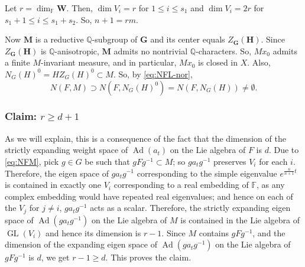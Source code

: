 \documentclass[12pt,reqno]{amsart}
\newcommand{\GL}{\operatorname{GL}}
\numberwithin{equation}{section}
\theoremstyle{plain}
\theoremstyle{definition}
\theoremstyle{remark}
\newcommand\bfG{\mathbf{G}}
\newcommand\bfH{\mathbf{H}}
\newcommand\bfM{\mathbf{M}}
\newcommand\bfW{\mathbf{W}}
\newcommand\bbF{\mathbb{F}}
\newcommand{\Q}{\mathbb{Q}}
\DeclareMathOperator{\Ad}{Ad}
\begin{document}
    Let $r=\dim_\bbF \bfW$. Then, $\dim V_i=r$ for $1\leq i\leq s_1$ and $\dim V_{i}=2r$ for $s_1+1\leq i\leq s_1+s_2$. So, $n+1=rm$. 
    
    Now $\bfM$ is a reductive $\Q$-subgroup of $\bfG$ and its center equals $Z_\bfG(\bfH)$.  
    Since $Z_\bfG(\bfH)$ is $\Q$-anisotropic, $\bfM$ admits no nontrivial $\Q$-characters. So, $Mx_0$ admits a finite $M$-invariant measure, and in particular, $Mx_0$ is closed in $X$. Also, $N_G(H)^0=HZ_G(H)^0\subset M$. So, by \eqref{eq:NFL-nor},
    \begin{equation}
        \label{eq:NFM}
         N(F,M)\supset N(F,N_G(H)^0)=N(F,N_G(H))\neq \emptyset. 
    \end{equation}
   
   \subsubsection{Claim: $r\geq d+1$} \label{claim:3.2.1} As we will explain, this is a consequence of the fact that the dimension of the strictly expanding weight space of $\Ad(a_t)$ on the Lie algebra of $F$ is $d$. Due to \eqref{eq:NFM}, pick $g\in G$ be such that $gFg^{-1}\subset M$; so $ga_tg^{-1}$ preserves $V_i$ for each $i$. Therefore, the eigen space of $ga_tg^{-1}$ corresponding to the simple eigenvalue $e^{\frac{n}{n+1}t}$ is contained in exactly one $V_i$ corresponding to a real embedding of $\bbF$, as any complex embedding would have repeated real eigenvalues; and hence on each of the $V_j$ for $j\neq i$, $ga_tg^{-1}$ acts as a scalar. Therefore, the strictly expanding eigen space of $\Ad(ga_tg^{-1})$ on the Lie algebra of $M$ is contained in the Lie algebra of $\GL(V_i)$ and hence its dimension is $r-1$. Since $M$ contains $gFg^{-1}$, and the dimension of the expanding eigen space of $\Ad(ga_tg^{-1})$ on the Lie algebra of $gFg^{-1}$ is $d$, we get $r-1\geq d$. This proves the claim. 
\end{document}
